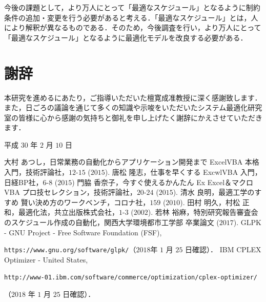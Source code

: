 \documentclass[a4paper,12pt,fleqn]{jarticle}
\begin{document}
今後の課題として，より万人にとって「最適なスケジュール」となるように制約条件の追加・変更を行う必要があると考える．「最適なスケジュール」とは，人により解釈が異なるものである．そのため，今後調査を行い，より万人にとって「最適なスケジュール」となるように最適化モデルを改良する必要がある．

\newpage
\section*{謝辞}
本研究を進めるにあたり，ご指導いただいた檀寛成准教授に深く感謝致します．また，日ごろの議論を通じて多くの知識や示唆をいただいたシステム最適化研究室の皆様に心から感謝の気持ちと御礼を申し上げたく謝辞にかえさせていただきます．

\begin{flushright} 
平成 $30$ 年 $2$ 月 $10$ 日
\end{flushright} 

\newpage
\begin{thebibliography}{99}
大村 あつし，日常業務の自動化からアプリケーション開発まで ExcelVBA 本格入門，技術評論社，$12$-$15$ ($2015$).
唐松 隆志，仕事を早くする ExcwlVBA 入門，日経BP社，$6$-$8$ ($2015$)
門脇 香奈子，今すぐ使えるかんたん Ex Excel＆マクロ VBA プロ技セレクション，技術評論社，$20$-$24$ ($2015$).
清水 良明，最適工学のすすめ 賢い決め方のワークベンチ，コロナ社，$159$ ($2010$).
田村 明久，村松 正和，最適化法，共立出版株式会社，$1$-$3$ ($2002$).
若林 裕麻，特別研究報告審査会のスケジュール作成の自動化，関西大学環境都市工学部 卒業論文 ($2017$).
GLPK - GNU Project - Free Software Foundation (FSF), \par \verb|https://www.gnu.org/software/glpk/|（$2018$年 $1$ 月 $25$ 日確認）．
IBM CPLEX Optimizer - United States, \par \verb|http://www-01.ibm.com/software/commerce/optimization/cplex-optimizer/| \par（$2018$ 年 $1$ 月 $25$ 日確認）．
\end{thebibliography}

 \newpage
 \appendix
\end{document}
